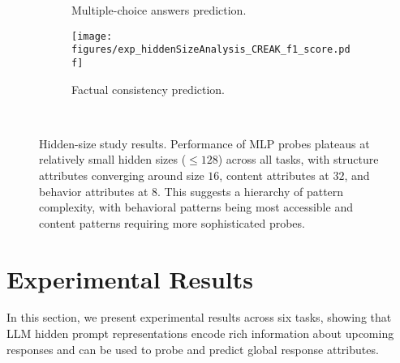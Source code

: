 \begin{figure*}[tb!]
\begin{subfigure}[b]{0.32\linewidth}
        \caption{Multiple-choice answers prediction.}
        \label{fig:exp_multiplechoice_answers_hiddenSize}
    \end{subfigure}
    \hfill
    \setcounter{mycounter}{6}
    \begin{subfigure}[b]{0.32\linewidth}
        \centering
        \texttt{[image: figures/exp\_hiddenSizeAnalysis\_CREAK\_f1\_score.pdf]}
        \caption{Factual consistency prediction.}
        \label{fig:exp_factual_consistency_hiddenSize}
    \end{subfigure}
    \\
    \vspace{-10pt}
    \caption{\label{fig:exp_hiddenSize} Hidden-size study results. Performance of MLP probes plateaus at relatively small hidden sizes ($\leq 128$) across all tasks, with structure attributes converging around size $16$, content attributes at $32$, and behavior attributes at $8$. This suggests a hierarchy of pattern complexity, with behavioral patterns being most accessible and content patterns requiring more sophisticated probes.}
\end{figure*}




\section{Experimental Results}

In this section, we present experimental results across six tasks, showing that LLM hidden prompt representations encode rich information about upcoming responses and can be used to probe and predict global response attributes.



